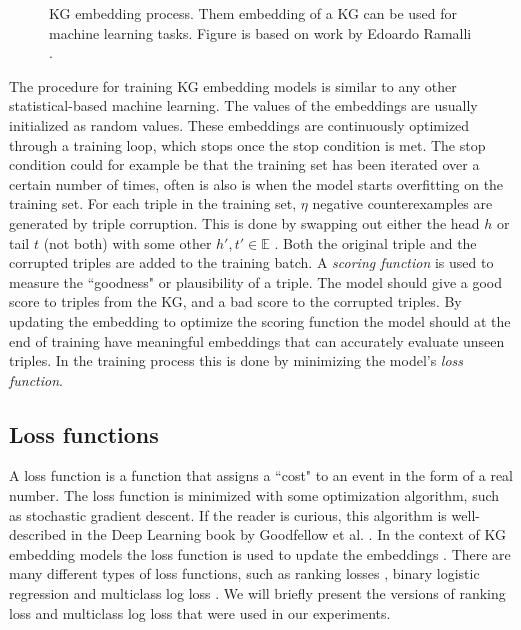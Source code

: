 \begin{figure}[htp]
    \centering
    
    \caption[KG embedding process.]{KG embedding process. Them embedding of a KG can be used for machine learning tasks. Figure is based on work by Edoardo Ramalli \cite{wiki_KG_embedding}.}
    \label{KG_embdding_diag}
\end{figure}

The procedure for training KG embedding models is similar to any other statistical-based machine learning. The values of the embeddings are usually initialized as random values. These embeddings are continuously optimized through a training loop, which stops once the stop condition is met. The stop condition could for example be that the training set has been iterated over a certain number of times, often is also is when the model starts overfitting on the training set. For each triple in the training set, $\eta$ negative counterexamples are generated by triple corruption. This is done by swapping out either the head $h$ or tail $t$ (not both) with some other $h', t' \in \mathbb{E}$ \cite{TransE}. Both the original triple and the corrupted triples are added to the training batch. A \textit{scoring function} is used to measure the ``goodness" or plausibility of a triple. The model should give a good score to triples from the KG, and a bad score to the corrupted triples. By updating the embedding to optimize the scoring function the model should at the end of training have meaningful embeddings that can accurately evaluate unseen triples. In the training process this is done by minimizing the model's \textit{loss function}.

\subsection{Loss functions}
A loss function is a function that assigns a ``cost" to an event in the form of a real number. The loss function is minimized with some optimization algorithm, such as stochastic gradient descent. If the reader is curious, this algorithm is well-described in the Deep Learning book by Goodfellow et al. \cite[p. 149]{goodfellow}. In the context of KG embedding models the loss function is used to update the embeddings \cite{dai2020survey}. There are many different types of loss functions, such as ranking losses \cite{TransE}, binary logistic regression \cite{complEx} and multiclass log loss \cite{kadlec2017knowledge}. We will briefly present the versions of ranking loss and multiclass log loss that were used in our experiments.

